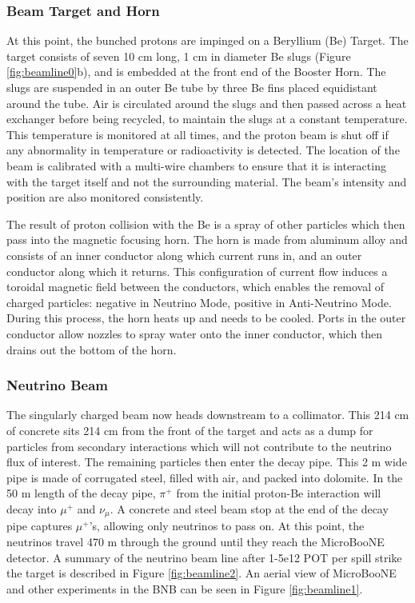 \subsubsection{Beam Target and Horn}
\par At this point, the bunched protons are impinged on a Beryllium (Be) Target. The target consists of seven 10 cm long, 1 cm in diameter Be slugs (Figure \ref{fig:beamline0}b), and is embedded at the front end of the Booster Horn. The slugs are suspended in an outer Be tube by three Be fins placed equidistant around the tube.  Air is circulated around the slugs and then passed across a heat exchanger before being recycled, to maintain the slugs at a constant temperature. This temperature is monitored at all times, and the proton beam is shut off if any abnormality in temperature or radioactivity is detected. The location of the beam is calibrated with a multi-wire chambers to ensure that it is interacting with the target itself and not the surrounding material. The beam's intensity and position are also monitored consistently.
\par The result of proton collision with the Be is a spray of other particles which then pass into the magnetic focusing horn. The horn is made from aluminum alloy and consists of an inner conductor along which current runs in, and an outer conductor along which it returns. This configuration of current flow induces a toroidal magnetic field between the conductors, which enables the removal of charged particles: negative in Neutrino Mode, positive in Anti-Neutrino Mode. During this process, the horn heats up and needs to be cooled.  Ports in the outer conductor allow nozzles to spray water onto the inner conductor, which then drains out the bottom of the horn.




\subsubsection{Neutrino Beam}
\par The singularly charged beam now heads downstream to a collimator.  This 214 cm of concrete sits 214 cm from the front of the target and acts as a dump for particles from secondary interactions which will not contribute to the neutrino flux of interest. The remaining particles then enter the decay pipe.  This 2 m wide pipe is made of corrugated steel, filled with air, and packed into dolomite. In the 50 m length of the decay pipe, $\pi^+$ from the initial proton-Be interaction will decay into $\mu^+$ and $\nu_\mu$.  A concrete and steel beam stop at the end of the decay pipe captures $\mu^+$'s, allowing only neutrinos to pass on.  At this point, the neutrinos travel 470 m through the ground until they reach the MicroBooNE detector. A summary of the neutrino beam line after 1-5e12 POT per spill strike the target is described in Figure \ref{fig:beamline2}.  An aerial view of MicroBooNE and other experiments in the BNB can be seen in Figure \ref{fig:beamline1}.

